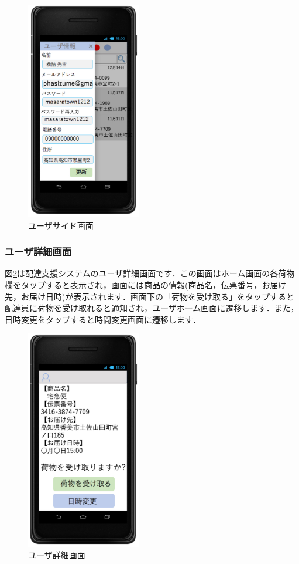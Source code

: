 \documentclass[a4j,titlepage]{jarticle}
\begin{document}
\begin{figure}[htbp]
 \begin{center}
  \includegraphics[width=50mm]{user_side}
	\caption{ユーザサイド画面}
	\label{fig:user_side}
 \end{center}

\end{figure}

\subsubsection{ユーザ詳細画面}
図\ref{fig:user_details}は配達支援システムのユーザ詳細画面です．この画面はホーム画面の各荷物欄をタップすると表示され，画面には商品の情報(商品名，伝票番号，お届け先，お届け日時)が表示されます．画面下の「荷物を受け取る」をタップすると配達員に荷物を受け取れると通知され，ユーザホーム画面に遷移します．また，日時変更をタップすると時間変更画面に遷移します．
\begin{figure}[htbp]
 \begin{center}
  \includegraphics[width=50mm]{user_details}
	\caption{ユーザ詳細画面}
	\label{fig:user_details}
 \end{center}

\end{figure}
\end{document}
